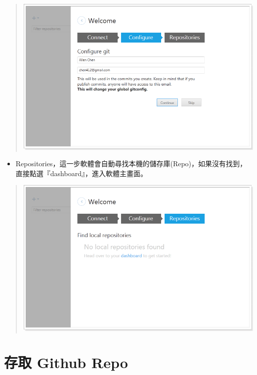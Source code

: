 \documentclass[letterpaper,10pt,english]{sphinxmanual}
\begin{document}
\begin{quote}

\includegraphics{GitHub-Install-007.png}
\end{quote}
\begin{itemize}
\item {} 
Repositories，這一步軟體會自動尋找本機的儲存庫(Repo)，如果沒有找到，直接點選『dashboard』，進入軟體主畫面。

\end{itemize}
\begin{quote}

\includegraphics{GitHub-Install-008.png}
\end{quote}


\section{存取 Github Repo}
\label{_doc/writing/index-github:github-repo}
\end{document}
